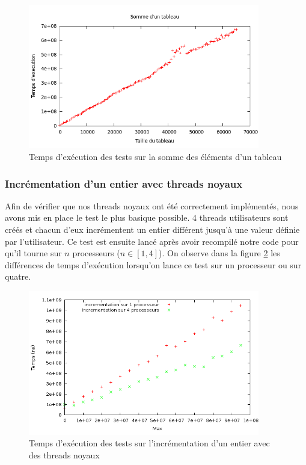 \begin{figure}[H]
\centering
\includegraphics[width=0.9\textwidth]{figures/arraysum.png}
\caption{Temps d'exécution des tests sur la somme des éléments d'un tableau}
\label{fig:arraysum}
\end{figure}

\subsubsection{Incrémentation d'un entier avec threads noyaux}

Afin de vérifier que nos threads noyaux ont été correctement implémentés, nous
avons mis en place le test le plus basique possible. 4 threads utilisateurs
sont créés et chacun d'eux incrémentent un entier différent jusqu'à une valeur
définie par l'utilisateur. Ce test est ensuite lancé après avoir recompilé
notre code pour qu'il tourne sur $n$ processeurs ($n \in [1,4]$). On observe dans la
figure \ref{fig:comp-kthreads} les différences de temps d'exécution lorsqu'on
lance ce test sur un processeur ou sur quatre.

\begin{figure}[H]
\centering
\includegraphics[width=0.9\textwidth]{figures/comparatif_kthreads.png}
\caption{Temps d'exécution des tests sur l'incrémentation d'un entier avec des
  threads noyaux}
\label{fig:comp-kthreads}
\end{figure}
